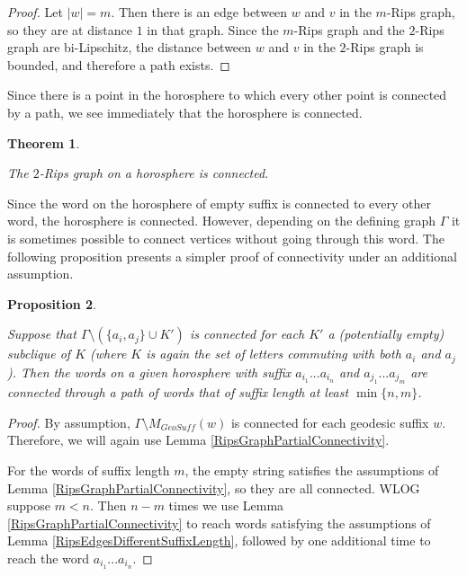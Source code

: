 \documentclass[10pt,a4paper]{amsart}
\newtheorem{theorem}{Theorem}[subsection]
\newtheorem{proposition}[theorem]{Proposition}
\theoremstyle{definition}
\theoremstyle{remark}
\begin{document}
	\begin{proof}
		
		Let $|w|=m$. Then there is an edge between $w$ and $v$ in the $m$-Rips graph, so they are at distance $1$ in that graph. Since the $m$-Rips graph and the $2$-Rips graph are bi-Lipschitz, the distance between $w$ and $v$ in the $2$-Rips graph is bounded, and therefore a path exists.
	\end{proof}
	
	Since there is a point in the horosphere to which every other point is connected by a path, we see immediately that the horosphere is connected.
	
	\begin{theorem} \label{RipsGraphConnectivity}
		
		The $2$-Rips graph on a horosphere is connected.
		
	\end{theorem}
	
	Since the word on the horosphere of empty suffix is connected to every other word, the horosphere is connected. However, depending on the defining graph $\Gamma$ it is sometimes possible to connect vertices without going through this word. The following proposition presents a simpler proof of connectivity under an additional assumption.
	
	\begin{proposition}\label{RipsGraphNoCutPtConnectivity}
		
		Suppose that $\Gamma\setminus (\{a_i, a_j\}\cup K')$ is connected for each $K'$ a (potentially empty) subclique of $K$ (where $K$ is again the set of letters commuting with both $a_i$ and $a_j$). Then the words on a given horosphere with suffix $a_{i_1}...a_{i_n}$ and $a_{j_1}...a_{j_m}$ are connected through a path of words that of suffix length at least $\min\{n, m\}$.
		
	\end{proposition}
	
	\begin{proof}
		
		By assumption, $\Gamma\setminus M_{GeoSuff}(w)$ is connected for each geodesic suffix $w$. Therefore, we will again use Lemma \ref{RipsGraphPartialConnectivity}.
		
		For the words of suffix length $m$, the empty string satisfies the assumptions of Lemma \ref{RipsGraphPartialConnectivity}, so they are all connected. WLOG suppose $m<n$. Then $n-m$ times we use Lemma \ref{RipsGraphPartialConnectivity} to reach words satisfying the assumptions of Lemma \ref{RipsEdgesDifferentSuffixLength}, followed by one additional time to reach the word $a_{i_1}...a_{i_n}$.
	\end{proof}
	
\end{document}
